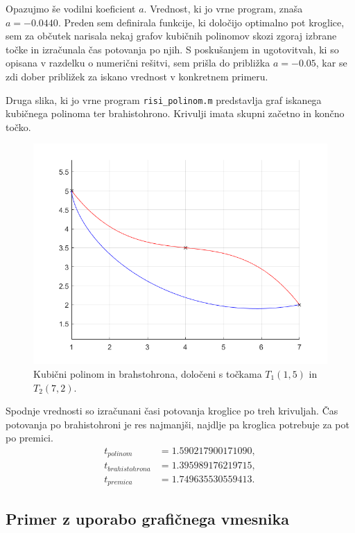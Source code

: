 \documentclass[a4paper]{article}
\begin{document}
Opazujmo še vodilni koeficient $a$. Vrednost, ki jo vrne program, znaša $a = -0.0440$. Preden sem definirala funkcije, ki določijo optimalno pot kroglice, sem za občutek narisala nekaj grafov kubičnih polinomov skozi zgoraj izbrane točke in izračunala čas potovanja po njih. S poskušanjem in ugotovitvah, ki so opisana v razdelku o numerični rešitvi, sem prišla do približka $a = -0.05$, kar se zdi dober približek za iskano vrednost v konkretnem primeru. 

Druga slika, ki jo vrne program \texttt{risi\_polinom.m} predstavlja graf iskanega kubičnega polinoma ter brahistohrono. Krivulji imata skupni začetno in končno točko. 
%
\begin{figure}[h!]
\begin{center}
\includegraphics[scale=0.52]{primer2-PolBrah.png}
\caption{Kubični polinom in brahstohrona, določeni s točkama $T_1(1,5)$ in $T_2(7,2)$.}
\end{center}
\end{figure}
%

Spodnje vrednosti so izračunani časi potovanja kroglice po treh krivuljah. Čas potovanja po brahistohroni je res najmanjši, najdlje pa kroglica potrebuje za pot po premici.
%
\begin{align*}
t_{polinom} &= 1.590217900171090, \\
t_{brahistohrona} &= 1.395989176219715, \\
t_{premica} &= 1.749635530559413.
\end{align*}

\subsection{Primer z uporabo grafičnega vmesnika}
\end{document}
